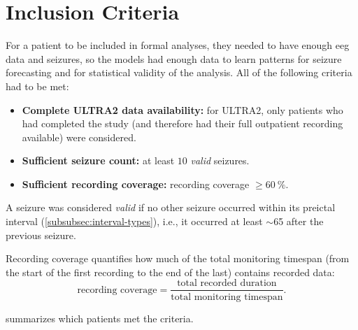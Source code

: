 \section{Inclusion Criteria}\label{sec:inclusion-criteria}

For a patient to be included in formal analyses, they needed to have enough \gls{eeg} data and seizures, so the models had enough data to learn patterns for seizure forecasting and for statistical validity of the analysis.
All of the following criteria had to be met:
\begin{itemize}
    \item \textbf{Complete ULTRA2 data availability:} for ULTRA2, only patients who had completed the study (and therefore had their full outpatient recording available) were considered.
    \item \textbf{Sufficient seizure count:} at least $10$ \emph{valid} seizures.
    \item \textbf{Sufficient recording coverage:} recording coverage $\geq\SI{60}{\percent}$.
\end{itemize}

A seizure was considered \emph{valid} if no other seizure occurred within its preictal interval (\cref{subsubsec:interval-types}), i.e., it occurred at least $\sim$\SI{65}{\min} after the previous seizure.

Recording coverage quantifies how much of the total monitoring timespan (from the start of the first recording to the end of the last) contains recorded data:
\[
\text{recording coverage} = \frac{\text{total recorded duration}}{\text{total monitoring timespan}}.
\]

 summarizes which patients met the criteria.

\begin{table}[hptb]
    \centering
    \caption[Patient Inclusion]{Patient Inclusion Criteria.\\
    Next to the valid seizures and recording coverage, it is denoted whether the corresponding criteria were met ($\checkmark$) or not ($\times$). ULTRA2 patients who had not completed the study are omitted.}
    \label{tab:patient-inclusion}
    \setlength{\tabcolsep}{9pt}
    \renewcommand{\arraystretch}{1.15}
    
\end{table}
